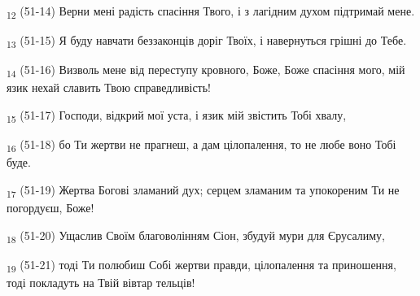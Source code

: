 \begin{tcolorbox}
\textsubscript{12} (51-14) Верни мені радість спасіння Твого, і з лагідним духом підтримай мене.
\end{tcolorbox}
\begin{tcolorbox}
\textsubscript{13} (51-15) Я буду навчати беззаконців доріг Твоїх, і навернуться грішні до Тебе.
\end{tcolorbox}
\begin{tcolorbox}
\textsubscript{14} (51-16) Визволь мене від переступу кровного, Боже, Боже спасіння мого, мій язик нехай славить Твою справедливість!
\end{tcolorbox}
\begin{tcolorbox}
\textsubscript{15} (51-17) Господи, відкрий мої уста, і язик мій звістить Тобі хвалу,
\end{tcolorbox}
\begin{tcolorbox}
\textsubscript{16} (51-18) бо Ти жертви не прагнеш, а дам цілопалення, то не любе воно Тобі буде.
\end{tcolorbox}
\begin{tcolorbox}
\textsubscript{17} (51-19) Жертва Богові зламаний дух; серцем зламаним та упокореним Ти не погордуєш, Боже!
\end{tcolorbox}
\begin{tcolorbox}
\textsubscript{18} (51-20) Ущаслив Своїм благоволінням Сіон, збудуй мури для Єрусалиму,
\end{tcolorbox}
\begin{tcolorbox}
\textsubscript{19} (51-21) тоді Ти полюбиш Собі жертви правди, цілопалення та приношення, тоді покладуть на Твій вівтар тельців!
\end{tcolorbox}
